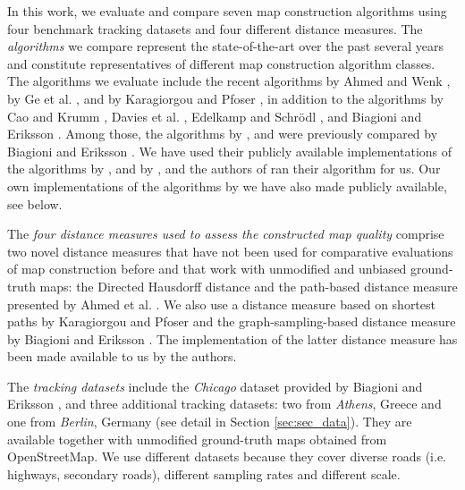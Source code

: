 \documentclass[natbib]{svjour3}                    \smartqed  \usepackage[table]{xcolor}
\begin{document}
In this work, we evaluate and compare seven map construction algorithms using four benchmark tracking datasets and four different distance measures. 
The \emph{algorithms} we compare represent the state-of-the-art over the past several years and constitute representatives of different map construction algorithm classes. The algorithms we evaluate include the recent algorithms by Ahmed and Wenk \cite{csm_esa2012}, by Ge et al. \cite{DBLP:conf/nips/GeSBW11}, and by Karagiorgou and Pfoser \cite{Karagiorgou:2012:VTD:2424321.2424334}, in addition to the algorithms by Cao and Krumm \cite{Cao:2009:GTR:1653771.1653776}, Davies et al. \cite{Davies:2006:SDR:1175887.1176088}, Edelkamp and Schr\"odl \cite{edelkamp:2003:rpmi}, and Biagioni and Eriksson \cite{Biagioni:2012:MIF:2424321.2424333}. 
Among those, the algorithms by \cite{Cao:2009:GTR:1653771.1653776}, \cite{Davies:2006:SDR:1175887.1176088} and \cite{edelkamp:2003:rpmi} were previously compared by Biagioni and Eriksson \cite{be-irmgp-12}. We have used their publicly available implementations of the algorithms by \cite{Cao:2009:GTR:1653771.1653776}, \cite{Davies:2006:SDR:1175887.1176088, edelkamp:2003:rpmi} and by \cite{Biagioni:2012:MIF:2424321.2424333}, and the authors of \cite{DBLP:conf/nips/GeSBW11} ran their algorithm for us. Our own implementations of the algorithms by \cite{csm_esa2012,Karagiorgou:2012:VTD:2424321.2424334} we have also made publicly available, see below.

The \emph{four distance measures used to assess the constructed map quality} comprise two novel distance measures that have not been used for comparative evaluations of map construction before and that work with unmodified and unbiased ground-truth maps: the Directed Hausdorff distance \cite{ag-dgsmi-99} and the path-based distance measure presented by Ahmed et al. \cite{aw-SIGSPATIAL-13}.
We also use a distance measure based on shortest paths by Karagiorgou and Pfoser \cite{Karagiorgou:2012:VTD:2424321.2424334} and the graph-sampling-based distance measure by Biagioni and Eriksson \cite{Biagioni:2012:MIF:2424321.2424333}. The implementation of the latter distance measure  \cite{Biagioni:2012:MIF:2424321.2424333} has been made available to us by the authors.

The \emph{tracking datasets} include the \emph{Chicago} dataset provided by Biagioni and Eriksson \cite{be-irmgp-12,Biagioni:2012:MIF:2424321.2424333}, and three additional tracking datasets: two from \emph{Athens}, Greece and one from \emph{Berlin}, Germany (see detail in Section \ref{sec:sec_data}). They are available together with unmodified ground-truth maps obtained from OpenStreetMap. We use different datasets because they cover diverse roads (i.e. highways, secondary roads), different sampling rates and different scale.
\end{document}
